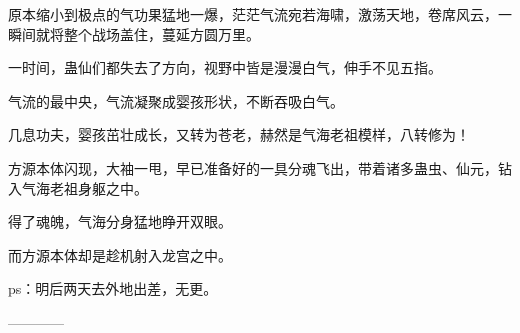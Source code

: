 \begin{this_body}
原本缩小到极点的气功果猛地一爆，茫茫气流宛若海啸，激荡天地，卷席风云，一瞬间就将整个战场盖住，蔓延方圆万里。

一时间，蛊仙们都失去了方向，视野中皆是漫漫白气，伸手不见五指。

气流的最中央，气流凝聚成婴孩形状，不断吞吸白气。

几息功夫，婴孩茁壮成长，又转为苍老，赫然是气海老祖模样，八转修为！

方源本体闪现，大袖一甩，早已准备好的一具分魂飞出，带着诸多蛊虫、仙元，钻入气海老祖身躯之中。

得了魂魄，气海分身猛地睁开双眼。

而方源本体却是趁机射入龙宫之中。

ps：明后两天去外地出差，无更。

------------

\end{this_body}


